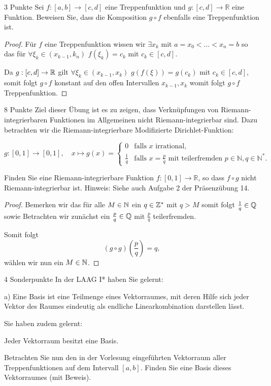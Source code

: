 \documentclass{../problemset}
\begin{document}
\begin{problem}{3 Punkte}
Sei $f: [a, b] \to [c, d]$ eine Treppenfunktion und $g: [c, d] \to \mathbb{R}$ eine Funktion. Beweisen Sie, dass die Komposition $g \circ f$ ebenfalls eine Treppenfunktion ist.


\begin{proof}
    Für $f$ eine Treppenfunktion wissen wir $\exists x_k$ mit $a = x_0 < \dots < x_n = b$ so das für $\forall \xi_k \in (x_{k-1}, k_n)$ $f(\xi_k) = c_k$ mit $c_k \in [c,d]$.
    
    Da $g: [c,d] \rightarrow \mathbb{R}$ gilt $\forall \xi_k \in (x_{k-1}, x_k)$ $g(f(\xi)) = g(c_k)$ mit $c_k \in [c,d]$, somit folgt $g \circ f$ konstant auf den offen Intervallen $x_{k-1}, x_k$ womit folgt $g \circ f$ Treppenfunktion. 
\end{proof}


\end{problem}

\begin{problem}{8 Punkte}
Ziel dieser Übung ist es zu zeigen, dass Verknüpfungen von Riemann-integrierbaren Funktionen im Allgemeinen nicht Riemann-integrierbar sind. Dazu betrachten wir die Riemann-integrierbare Modifizierte Dirichlet-Funktion:

\[ g: [0, 1] \to [0, 1], \quad x \mapsto g(x) = \begin{cases}
    0 & \text{falls } x \text{ irrational}, \\
    \frac{1}{q} & \text{falls } x = \frac{p}{q} \text{ mit teilerfremden } p \in \mathbb{N}, q \in \mathbb{N}^*.
\end{cases} \]

Finden Sie eine Riemann-integrierbare Funktion $f: [0, 1] \to \mathbb{R}$, so dass $f \circ g$ nicht Riemann-integrierbar ist. Hinweis: Siehe auch Aufgabe 2 der Präsenzübung 14.

\begin{proof}
    Bemerken wir das für alle $M \in \mathbb{N}$ ein $q \in \mathbb{Z}^*$ mit $q > M$ somit folgt $\frac{1}{q} \in \mathbb{Q}$ sowie 
    Betrachten wir zunächst ein $\frac{p}{q} \in \mathbb{Q}$ mit $\frac{p}{q}$ teilerfremden. 

    Somit folgt \[
        (g \circ g)\left(\frac{p}{q}\right) = q,
    \] wählen wir nun ein $M \in \mathbb{N}$.
\end{proof}

\end{problem}

\begin{problem}{4 Sonderpunkte}
In der LAAG I* haben Sie gelernt:

a) Eine Basis ist eine Teilmenge eines Vektorraumes, mit deren Hilfe sich jeder Vektor des Raumes eindeutig als endliche Linearkombination darstellen lässt.

Sie haben zudem gelernt:

Jeder Vektorraum besitzt eine Basis.

Betrachten Sie nun den in der Vorlesung eingeführten Vektorraum aller Treppenfunktionen auf dem Intervall $[a, b]$. Finden Sie eine Basis dieses Vektorraumes (mit Beweis).
\end{problem}
\end{document}

